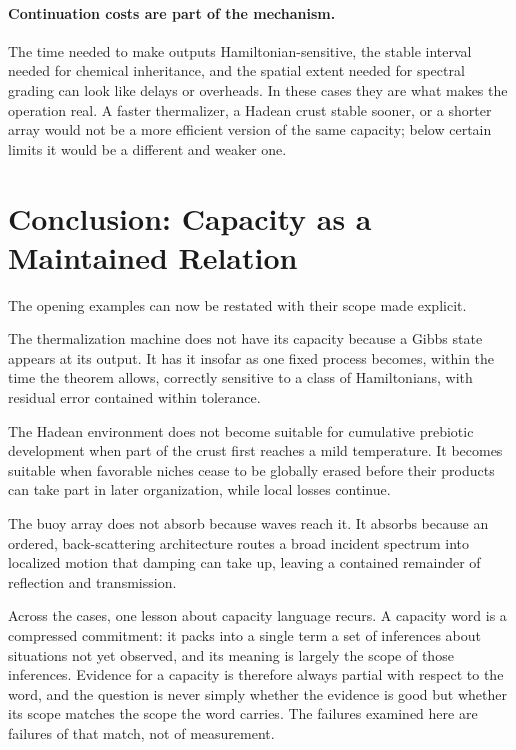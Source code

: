 \documentclass[11pt]{article}
\theoremstyle{definition}
\begin{document}
\paragraph{Continuation costs are part of the mechanism.} The time needed to make outputs Hamiltonian-sensitive, the stable interval needed for chemical inheritance, and the spatial extent needed for spectral grading can look like delays or overheads. In these cases they are what makes the operation real. A faster thermalizer, a Hadean crust stable sooner, or a shorter array would not be a more efficient version of the same capacity; below certain limits it would be a different and weaker one.

\section{Conclusion: Capacity as a Maintained Relation}

The opening examples can now be restated with their scope made explicit.

The thermalization machine does not have its capacity because a Gibbs state appears at its output. It has it insofar as one fixed process becomes, within the time the theorem allows, correctly sensitive to a class of Hamiltonians, with residual error contained within tolerance.

The Hadean environment does not become suitable for cumulative prebiotic development when part of the crust first reaches a mild temperature. It becomes suitable when favorable niches cease to be globally erased before their products can take part in later organization, while local losses continue.

The buoy array does not absorb because waves reach it. It absorbs because an ordered, back-scattering architecture routes a broad incident spectrum into localized motion that damping can take up, leaving a contained remainder of reflection and transmission.

Across the cases, one lesson about capacity language recurs. A capacity word is a compressed commitment: it packs into a single term a set of inferences about situations not yet observed, and its meaning is largely the scope of those inferences. Evidence for a capacity is therefore always partial with respect to the word, and the question is never simply whether the evidence is good but whether its scope matches the scope the word carries. The failures examined here are failures of that match, not of measurement.
\end{document}
